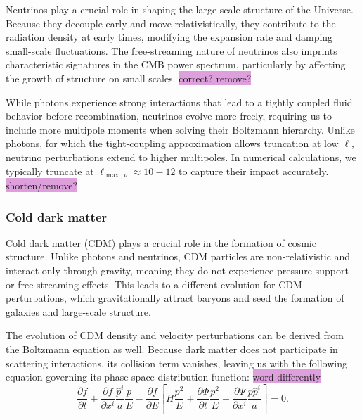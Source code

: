 \documentclass{aa}
\numberwithin{equation}{section}
\numberwithin{table}{section}
\numberwithin{figure}{section}
\begin{document}
Neutrinos play a crucial role in shaping the large-scale structure of the Universe. Because they decouple early and move relativistically, they contribute to the radiation density at early times, modifying the expansion rate and damping small-scale fluctuations. The free-streaming nature of neutrinos also imprints characteristic signatures in the CMB power spectrum, particularly by affecting the growth of structure on small scales. \colorbox{Plum}{correct? remove?}

While photons experience strong interactions that lead to a tightly coupled fluid behavior before recombination, neutrinos evolve more freely, requiring us to include more multipole moments when solving their Boltzmann hierarchy. Unlike photons, for which the tight-coupling approximation allows truncation at low $\ell$, neutrino perturbations extend to higher multipoles. In numerical calculations, we typically truncate at $\ell_{\max, \nu} \approx 10-12$ to capture their impact accurately. \colorbox{Plum}{shorten/remove?}





\subsubsection{Cold dark matter}
Cold dark matter (CDM) plays a crucial role in the formation of cosmic structure. Unlike photons and neutrinos, CDM particles are non-relativistic and interact only through gravity, meaning they do not experience pressure support or free-streaming effects. This leads to a different evolution for CDM perturbations, which gravitationally attract baryons and seed the formation of galaxies and large-scale structure.

The evolution of CDM density and velocity perturbations can be derived from the Boltzmann equation as well. Because dark matter does not participate in scattering interactions, its collision term vanishes, leaving us with the following equation governing its phase-space distribution function: \colorbox{Plum}{word differently}
\begin{equation}
\frac{\partial f}{\partial t} + \frac{\partial f}{\partial x^i} \frac{\hat{p}^i}{a} \frac{p}{E} - \frac{\partial f}{\partial E} \left[ H \frac{p^2}{E} + \frac{\partial \Phi}{\partial t} \frac{p^2}{E} + \frac{\partial \Psi}{\partial x^i} \frac{p \hat{p}^i}{a} \right] = 0.
\end{equation}
\end{document}
